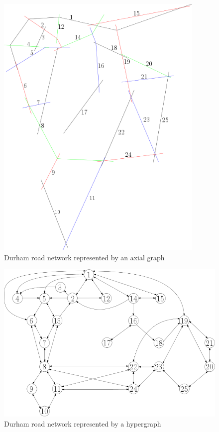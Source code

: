 \documentclass[11pt]{report}
\begin{document}
\begin{figure}[h]
\centering
\includegraphics[width=10cm]{axial_colour_label.png}
\caption{Durham road network represented by an axial graph}
\label{durham axial}
\end{figure}

\begin{figure}[h]
\includegraphics[width=\linewidth]{ipe_durham.png}
\caption{Durham road network represented by a hypergraph}
\label{durham graph}
\end{figure}
\end{document}
